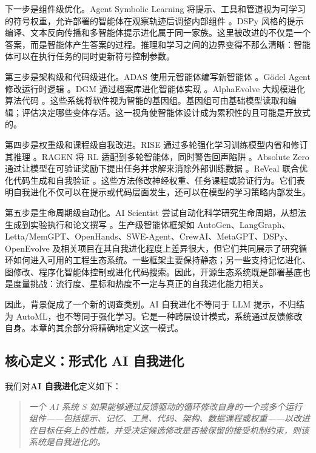 下一步是组件级优化。Agent Symbolic Learning 将提示、工具和管道视为可学习的符号权重，允许部署的智能体在观察轨迹后调整内部组件 \cite{agentsymboliclearning2024}。DSPy 风格的提示编译、文本反向传播和多智能体提示进化属于同一家族。这里被改进的不仅是一个答案，而是智能体产生答案的过程。推理和学习之间的边界变得不那么清晰：智能体可以在执行任务的同时更新符号控制参数。

第三步是架构级和代码级进化。ADAS 使用元智能体编写新智能体 \cite{adas2025}。G{\"o}del Agent 修改运行时逻辑 \cite{yin2024godel}。DGM 通过档案库进化智能体实现 \cite{darwingodelmachine2025}。AlphaEvolve 大规模进化算法代码 \cite{alphaevolve2025}。这些系统将软件视为智能的基因组。基因组可由基础模型读取和编辑；评估决定哪些变体存活。这一视角使智能体设计成为累积性的且可能是开放式的。

第四步是权重级和课程级自我改进。RISE 通过多轮强化学习训练模型内省和修订其推理 \cite{qu2024rise}。RAGEN 将 RL 适配到多轮智能体，同时警告回声陷阱 \cite{wang2025ragen}。Absolute Zero 通过让模型在可验证奖励下提出任务并求解来消除外部训练数据 \cite{absolutezero2025}。ReVeal 联合优化代码生成和自我验证 \cite{reveal2025}。这些方法修改神经权重、任务课程或验证行为。它们表明自我进化不仅可以在提示或代码层面发生，还可以在模型的学习策略内部发生。

第五步是生命周期级自动化。AI Scientist 尝试自动化科学研究生命周期，从想法生成到实验执行和论文撰写 \cite{aiscientist2024}。生产级智能体框架如 AutoGen、LangGraph、Letta/MemGPT、OpenHands、SWE-Agent、CrewAI、MetaGPT、DSPy、OpenEvolve 及相关项目在其自我进化程度上差异很大，但它们共同展示了研究循环如何进入可用的工程生态系统。一些框架主要保持静态；另一些支持记忆进化、图修改、程序化智能体控制或进化代码搜索。因此，开源生态系统既是部署基底也是度量挑战：流行度、星标和热度不一定与真正的自我进化能力相关。

因此，背景促成了一个新的调查类别。AI 自我进化不等同于 LLM 提示，不归结为 AutoML，也不等同于强化学习。它是一种跨层设计模式，系统通过反馈修改自身。本章的其余部分将精确地定义这一模式。

\subsection{核心定义：形式化 AI 自我进化}
\label{subsec:intro-definition}

我们对\textbf{AI 自我进化}定义如下：

\begin{quote}
\textit{一个 AI 系统 $S$ 如果能够通过反馈驱动的循环修改自身的一个或多个运行组件——包括提示、记忆、工具、代码、架构、数据课程或权重——以改进在目标任务上的性能，并受决定候选修改是否被保留的接受机制约束，则该系统是自我进化的。}
\end{quote}

